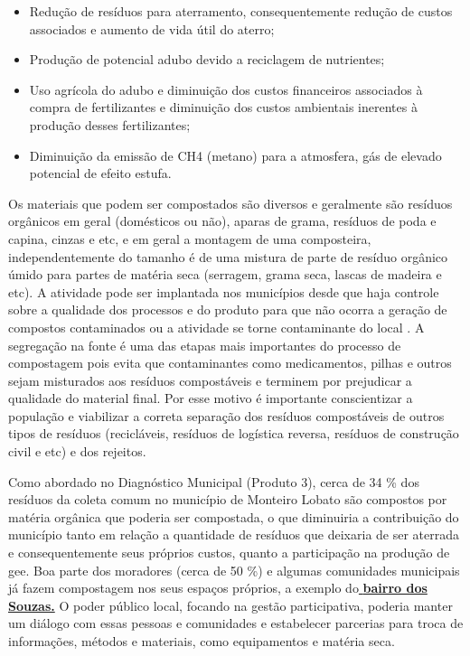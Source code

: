 \begin{itemize}
	\item Redução de resíduos para aterramento, consequentemente redução de custos associados e aumento de vida útil do aterro;
	\item Produção de potencial adubo devido a reciclagem de nutrientes;
	\item Uso agrícola do adubo e diminuição dos custos financeiros associados à compra de fertilizantes e diminuição dos custos ambientais inerentes à produção desses fertilizantes;
	\item Diminuição da emissão de CH4 (metano) para a atmosfera, gás de elevado potencial de efeito estufa. 
\end{itemize}

Os materiais que podem ser compostados são diversos e geralmente são resíduos orgânicos em geral (domésticos ou não), aparas de grama, resíduos de poda e capina, cinzas e etc, e em geral a montagem de uma composteira, independentemente do tamanho é de uma mistura de parte de resíduo orgânico úmido para partes de matéria seca (serragem, grama seca, lascas de madeira e etc). A atividade pode ser implantada nos municípios desde que haja controle sobre a qualidade dos processos e do produto para que não ocorra a geração de compostos contaminados ou a atividade se torne contaminante do local \cite{felipetto_conceito_2007}. A segregação na fonte é uma das etapas mais importantes do processo de compostagem pois evita que contaminantes como medicamentos, pilhas e outros sejam misturados aos resíduos compostáveis e terminem por prejudicar a qualidade do material final. Por esse motivo é importante conscientizar a população e viabilizar a correta separação dos resíduos compostáveis de outros tipos de resíduos (recicláveis, resíduos de logística reversa, resíduos de construção civil e etc) e dos rejeitos.

Como abordado no Diagnóstico Municipal (Produto 3), cerca de 34 \% dos resíduos da coleta comum no município de Monteiro Lobato são compostos por matéria orgânica que poderia ser compostada, o que diminuiria a contribuição do município tanto em relação a quantidade de resíduos que deixaria de ser aterrada e consequentemente seus próprios custos, quanto a participação na produção de \gls{gee}. Boa parte dos moradores (cerca de 50 \%) e algumas comunidades municipais já fazem compostagem nos seus espaços próprios, a exemplo do\underline{\textbf{ bairro dos Souzas.}} O poder público local, focando na gestão participativa, poderia manter um diálogo com essas pessoas e comunidades e estabelecer parcerias para troca de informações, métodos e materiais, como equipamentos e matéria seca.

